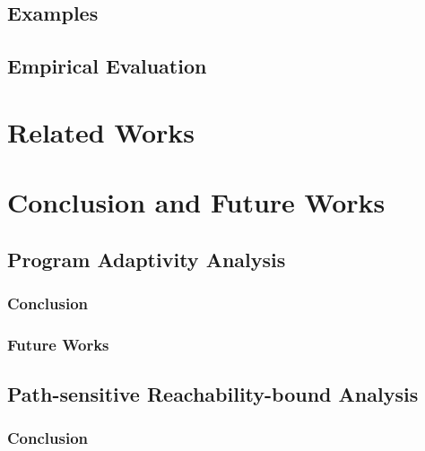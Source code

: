 \documentclass[12pt, letterpaper]{report}   %
\begin{document}
\section{Examples}
\label{sec:psRB-example}


\section{Empirical Evaluation}
\label{sec:psRB-implementation}


\chapter{Related Works}
\label{sec:psRB-relatedwork}


\chapter*{}


%
\chapter{Conclusion and Future Works}
\label{sec:conclusionfuture}


\section{Program Adaptivity Analysis}
\label{sec:conclusionfuture-adapt}

\subsection{Conclusion}
\label{sec:conclusion-adapt}


\subsection{Future Works}
\label{sec:future-adapt}


\section{Path-sensitive Reachability-bound Analysis}
\label{sec:conclusionfuture-psRB}
\subsection{Conclusion}
\label{sec:conclusion-psRB}

\end{document}
